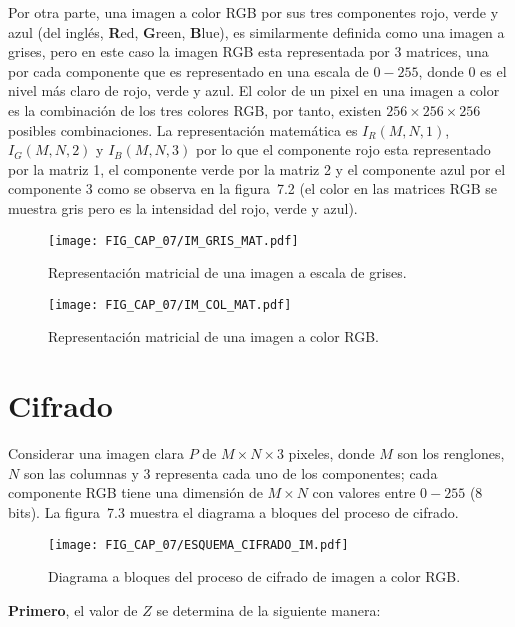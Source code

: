 Por otra parte, una imagen a color RGB por sus tres componentes rojo, verde y azul (del inglés, \textbf{R}ed, \textbf{G}reen, \textbf{B}lue), es similarmente definida como una imagen a grises, pero en este caso la imagen RGB esta representada por 3 matrices, una por cada componente que es representado en una escala de $0-255$, donde 0 es el nivel más claro de rojo, verde y azul. El color de un pixel en una imagen a color es la combinación de los tres colores RGB, por tanto, existen $256\times 256\times 256$ posibles combinaciones. La representación matemática es $I_{R}(M,N,1)$, $I_{G}(M,N,2)$ y $I_{B}(M,N,3)$ por lo que el componente rojo esta representado por la matriz 1, el componente verde por la matriz 2 y el componente azul por el componente 3 como se observa en la figura~7.2 (el color en las matrices RGB se muestra gris pero es la intensidad del rojo, verde y azul). 

\begin{figure}[!htbp] %
	\center
	\texttt{[image: FIG\_CAP\_07/IM\_GRIS\_MAT.pdf]}    
	\caption{Representación matricial de una imagen a escala de grises.}
\end{figure}

\begin{figure}[!htbp] %
	\center
	\texttt{[image: FIG\_CAP\_07/IM\_COL\_MAT.pdf]}   
	\caption{Representación matricial de una imagen a color RGB.}
\end{figure}

\section{Cifrado}
Considerar una imagen clara $P$ de $M\times N\times 3$ pixeles, donde $M$ son los renglones, $N$ son las columnas y 3 representa cada uno de los componentes; cada componente RGB tiene una dimensión de $M\times N$ con valores entre $0-255$ (8 bits). La figura~7.3 muestra el diagrama a bloques del proceso de cifrado.   

\begin{figure}[!htbp] %
	\center
	\texttt{[image: FIG\_CAP\_07/ESQUEMA\_CIFRADO\_IM.pdf]}  
	\caption{Diagrama a bloques del proceso de cifrado de imagen a color RGB.}
\end{figure}

\textbf{Primero}, el valor de $Z$ se determina de la siguiente manera: \\

